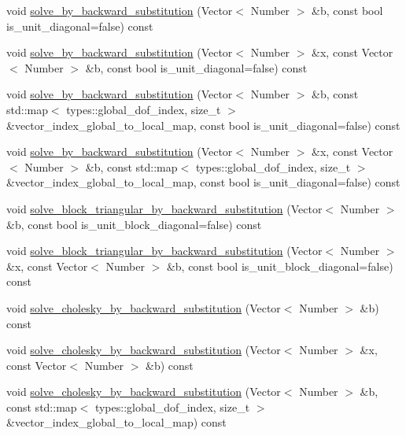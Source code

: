 \begin{DoxyCompactItemize}
\item 
void \hyperlink{classHMatrix_ac7231b00a53ef6b860d774d1daad738f}{solve\+\_\+by\+\_\+backward\+\_\+substitution} (Vector$<$ Number $>$ \&b, const bool is\+\_\+unit\+\_\+diagonal=false) const
\item 
void \hyperlink{classHMatrix_ab89582b86090d18d33f7ae04deda1f5f}{solve\+\_\+by\+\_\+backward\+\_\+substitution} (Vector$<$ Number $>$ \&x, const Vector$<$ Number $>$ \&b, const bool is\+\_\+unit\+\_\+diagonal=false) const
\item 
void \hyperlink{classHMatrix_aedc13c9cf448ec8b47147053d02f357b}{solve\+\_\+by\+\_\+backward\+\_\+substitution} (Vector$<$ Number $>$ \&b, const std\+::map$<$ types\+::global\+\_\+dof\+\_\+index, size\+\_\+t $>$ \&vector\+\_\+index\+\_\+global\+\_\+to\+\_\+local\+\_\+map, const bool is\+\_\+unit\+\_\+diagonal=false) const
\item 
void \hyperlink{classHMatrix_aa90525e857add22b334bac84e6baacd2}{solve\+\_\+by\+\_\+backward\+\_\+substitution} (Vector$<$ Number $>$ \&x, const Vector$<$ Number $>$ \&b, const std\+::map$<$ types\+::global\+\_\+dof\+\_\+index, size\+\_\+t $>$ \&vector\+\_\+index\+\_\+global\+\_\+to\+\_\+local\+\_\+map, const bool is\+\_\+unit\+\_\+diagonal=false) const
\item 
void \hyperlink{classHMatrix_aa81db0ff79182302de83d693bab9f9e3}{solve\+\_\+block\+\_\+triangular\+\_\+by\+\_\+backward\+\_\+substitution} (Vector$<$ Number $>$ \&b, const bool is\+\_\+unit\+\_\+block\+\_\+diagonal=false) const
\item 
void \hyperlink{classHMatrix_a69432f004b60ade76aaabf2c94dd205c}{solve\+\_\+block\+\_\+triangular\+\_\+by\+\_\+backward\+\_\+substitution} (Vector$<$ Number $>$ \&x, const Vector$<$ Number $>$ \&b, const bool is\+\_\+unit\+\_\+block\+\_\+diagonal=false) const
\item 
void \hyperlink{classHMatrix_a054ad84d52a9ee6df9df3bda0a17cfb7}{solve\+\_\+cholesky\+\_\+by\+\_\+backward\+\_\+substitution} (Vector$<$ Number $>$ \&b) const
\item 
void \hyperlink{classHMatrix_a880948492a7df252f3696219f6966703}{solve\+\_\+cholesky\+\_\+by\+\_\+backward\+\_\+substitution} (Vector$<$ Number $>$ \&x, const Vector$<$ Number $>$ \&b) const
\item 
void \hyperlink{classHMatrix_ae8bbf6f35a2099872fbcbfda2cb1abbd}{solve\+\_\+cholesky\+\_\+by\+\_\+backward\+\_\+substitution} (Vector$<$ Number $>$ \&b, const std\+::map$<$ types\+::global\+\_\+dof\+\_\+index, size\+\_\+t $>$ \&vector\+\_\+index\+\_\+global\+\_\+to\+\_\+local\+\_\+map) const

\end{DoxyCompactItemize}
